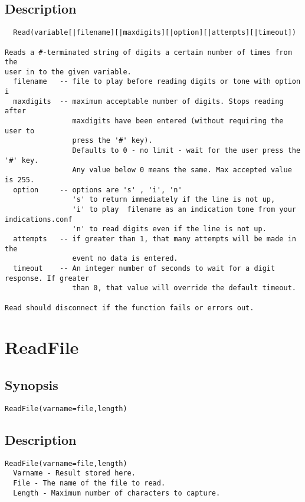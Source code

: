 \subsection{Description}
\begin{verbatim}
  Read(variable[|filename][|maxdigits][|option][|attempts][|timeout])

Reads a #-terminated string of digits a certain number of times from the
user in to the given variable.
  filename   -- file to play before reading digits or tone with option i
  maxdigits  -- maximum acceptable number of digits. Stops reading after
                maxdigits have been entered (without requiring the user to
                press the '#' key).
                Defaults to 0 - no limit - wait for the user press the '#' key.
                Any value below 0 means the same. Max accepted value is 255.
  option     -- options are 's' , 'i', 'n'
                's' to return immediately if the line is not up,
                'i' to play  filename as an indication tone from your indications.conf
                'n' to read digits even if the line is not up.
  attempts   -- if greater than 1, that many attempts will be made in the 
                event no data is entered.
  timeout    -- An integer number of seconds to wait for a digit response. If greater
                than 0, that value will override the default timeout.

Read should disconnect if the function fails or errors out.

\end{verbatim}


\section{ReadFile}
\subsection{Synopsis}
\begin{verbatim}
ReadFile(varname=file,length)
\end{verbatim}
\subsection{Description}
\begin{verbatim}
ReadFile(varname=file,length)
  Varname - Result stored here.
  File - The name of the file to read.
  Length - Maximum number of characters to capture.

\end{verbatim}


